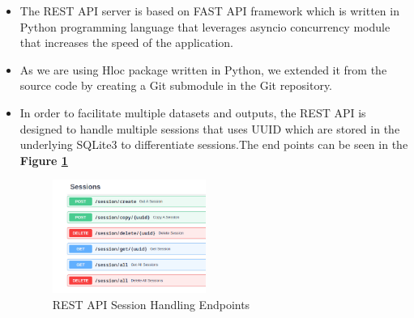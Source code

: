 \documentclass[sigconf]{acmart}
\begin{document}
\begin{itemize}
\item{The REST API server is based on FAST API framework which is written in Python programming language that leverages asyncio concurrency module that increases the speed of the application.}
\item{As we are using Hloc package written in Python, we extended it from the source code by creating a Git submodule in the Git repository.}
\item{In order to facilitate multiple datasets and outputs, the REST API is designed to handle multiple sessions that uses UUID\cite{uuid} which are stored in the underlying SQLite3\cite{SQLite3} to differentiate sessions.The end points can be seen in the \textbf{Figure \ref{fig:restsession}}
\begin{figure}[h]
  \centering
  \includegraphics[width=5cm]{images/restapi/1.png}
  \caption{REST API Session Handling Endpoints}
  \label{fig:restsession}
\end{figure}
}


\end{itemize}
\end{document}
